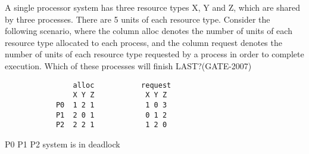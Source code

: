 

\setcounter{question}{0}

\begin{minipage}{\linewidth}

  \question  A single processor system has three resource types X, Y and Z, which are shared by three processes.
             There are 5 units of each resource type. Consider the following scenario, where the column alloc denotes the number
             of units of each resource type allocated to each process, and the column request denotes the number of units of
             each resource type requested by a process in order to complete execution. Which of these processes will finish LAST?(GATE-2007)

        \begin{lstlisting}
                alloc           request
                X Y Z            X Y Z
            P0  1 2 1            1 0 3
            P1  2 0 1            0 1 2
            P2  2 2 1            1 2 0
        \end{lstlisting}

  \begin{oneparchoices}
    \choice P0
    \choice P1
    \choice P2
    \choice system is in deadlock
  \end{oneparchoices}

  \end{minipage}

\vspace{0.08in}

